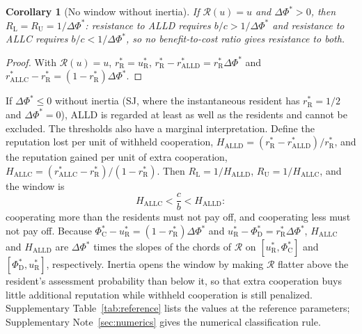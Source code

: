 \documentclass[fleqn,10pt]{article}
\theoremstyle{plain}
\newtheorem{corollary}[proposition]{Corollary}
\theoremstyle{remark}
\newcommand{\Rm}{\mathcal R}
\newcommand{\C}{\mathrm C}
\newcommand{\D}{\mathrm D}
\newcommand{\ALLC}{\mathrm{ALLC}}
\newcommand{\ALLD}{\mathrm{ALLD}}
\newcommand{\rR}{r^*_{\mathrm R}}
\newcommand{\uR}{u^*_{\mathrm R}}
\begin{document}
\begin{corollary}[No window without inertia]\label{cor:nowindow}
If $\Rm(u)=u$ and $\Delta\Phi^*>0$, then $R_{\mathrm L}=R_{\mathrm U}=1/\Delta\Phi^*$:
resistance to ALLD requires $b/c>1/\Delta\Phi^*$ and resistance to ALLC requires
$b/c<1/\Delta\Phi^*$, so no benefit-to-cost ratio gives resistance to both.
\end{corollary}
\begin{proof}
With $\Rm(u)=u$, $\rR=\uR$, $\rR-r^*_{\ALLD}=\rR\Delta\Phi^*$ and
$r^*_{\ALLC}-\rR=(1-\rR)\Delta\Phi^*$.
\end{proof}
If $\Delta\Phi^*\le0$ without inertia (SJ, where the instantaneous resident has
$\rR=1/2$ and $\Delta\Phi^*=0$), ALLD is regarded at least as well as the
residents and cannot be excluded. The thresholds also have a marginal
interpretation. Define the reputation lost per unit of withheld cooperation,
$H_{\ALLD}=(\rR-r^*_{\ALLD})/\rR$, and the reputation gained per unit of extra
cooperation, $H_{\ALLC}=(r^*_{\ALLC}-\rR)/(1-\rR)$. Then
$R_{\mathrm L}=1/H_{\ALLD}$, $R_{\mathrm U}=1/H_{\ALLC}$, and the window is
\begin{equation}
H_{\ALLC}<\frac cb<H_{\ALLD}:
\label{eq:S-marginal-window}
\end{equation}
cooperating more than the residents must not pay off, and cooperating less
must not pay off. Because $\Phi^*_\C-\uR=(1-\rR)\Delta\Phi^*$ and
$\uR-\Phi^*_\D=\rR\Delta\Phi^*$, $H_{\ALLC}$ and $H_{\ALLD}$ are $\Delta\Phi^*$ times
the slopes of the chords of $\Rm$ on $[\uR,\Phi^*_\C]$ and $[\Phi^*_\D,\uR]$,
respectively. Inertia opens the window by making $\Rm$ flatter above the
resident's assessment probability than below it, so that extra cooperation buys
little additional reputation while withheld cooperation is still penalized.
Supplementary Table~\ref{tab:reference} lists the values at the reference
parameters; Supplementary Note~\ref{sec:numerics} gives the numerical
classification rule.
\end{document}
